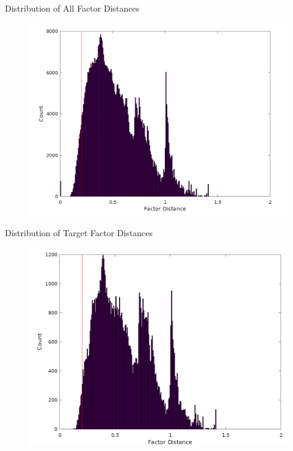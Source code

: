 \documentclass[handout]{beamer}
\begin{document}
\begin{frame}{Distribution of All Factor Distances}
  \begin{figure}
    \centering
    \includegraphics[height=0.6\textheight]{diagrams/conference-factor-distance}
  \end{figure}
\end{frame}


\begin{frame}{Distribution of Target Factor Distances}
  \begin{figure}
    \centering
    \includegraphics[height=0.6\textheight]{diagrams/conference-target-distance}
  \end{figure}
\end{frame}
\end{document}
